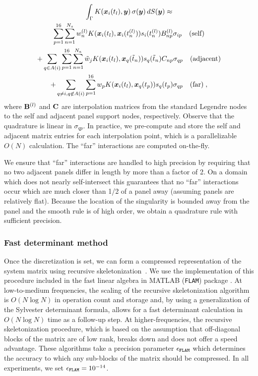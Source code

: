 \begin{multline}
  \int_\Gamma K({\boldsymbol x}_i(t_l),{\boldsymbol y}) \, \sigma({\boldsymbol y})
  \, dS({\boldsymbol y}) \approx \\
  \sum_{p=1}^{16} \sum_{n=1}^{N_s}
  w^{(l)}_{n} K({\boldsymbol x}_i(t_l),{\boldsymbol x}_i({t}^{(l)}_{n}))
  s_i({t}^{(l)}_{n}) B^{(l)}_{np} \sigma_{ip} \quad \textrm{(self)}
  \\
  + \sum_{q\in A(i)} \sum_{p=1}^{16} \sum_{n=1}^{N_a}
  \tilde{w}_jK({\boldsymbol x}_i(t_l),{\boldsymbol x}_q(\tilde{t}_n)) s_q(\tilde{t}_n)
  C_{np} \sigma_{qp}
  \quad \textrm{(adjacent)} \\
  + \sum_{q\neq i, q\not\in A(i)} \sum_{p=1}^{16}
  w_p K({\boldsymbol x}_i(t_l),{\boldsymbol x}_q(t_p)) s_q(t_p)
  \sigma_{qp} \quad \textrm{(far)} \nonumber \; ,
\end{multline}
where ${\bf B}^{(l)}$ and ${\bf C}$ are interpolation
matrices from the standard Legendre nodes
to the self and adjacent panel support nodes,
respectively. Observe that the quadrature is
linear in $\sigma_{qp}$. In practice, we pre-compute
and store the self and adjacent matrix entries for each
interpolation point, which is a parallelizable
$O(N)$ calculation. The ``far'' interactions
are computed on-the-fly.

\begin{remark}
  \label{rmk:levelrestrict}
  We ensure that ``far'' interactions
  are handled to high precision by requiring that
  no two adjacent panels differ in length
  by more than a factor of 2. On a domain which does
  not nearly self-intersect this
  guarantees that no ``far'' interactions occur
  which are much closer than 1/2 of a panel away
  (assuming panels are relatively flat).
  Because the location of the singularity is
  bounded away from the panel and the smooth
  rule is of high order, we obtain a quadrature
  rule with sufficient precision.
\end{remark}

\subsubsection{Fast determinant method}

Once the discretization is set, we can form
a compressed representation of the system matrix
using recursive skeletonization~\cite{ho2012fast}.
%
We use the implementation of this procedure
included in the fast linear algebra in
MATLAB (\texttt{FLAM}) package
\cite{hoFLAM_1253582}.
%
At low-to-medium frequencies, the scaling
of the recursive skeletonization algorithm
is $O(N\log N)$ in operation count and
storage and, by using a generalization
of the Sylvester determinant formula,
allows for a fast determinant
calculation in $O(N\log N)$ time as a
follow-up step.
%
At higher-frequencies,
the recursive skeletonization procedure,
which is based on the assumption that off-diagonal
blocks of the matrix are of low rank,
breaks down and does not offer a speed advantage.
%
These algorithms take a precision parameter
${\epsilon_{\texttt{FLAM}}}$ which determines the
accuracy to which any sub-blocks of the matrix
should be compressed. In all experiments,
we set ${\epsilon_{\texttt{FLAM}}} = 10^{-14}$.

